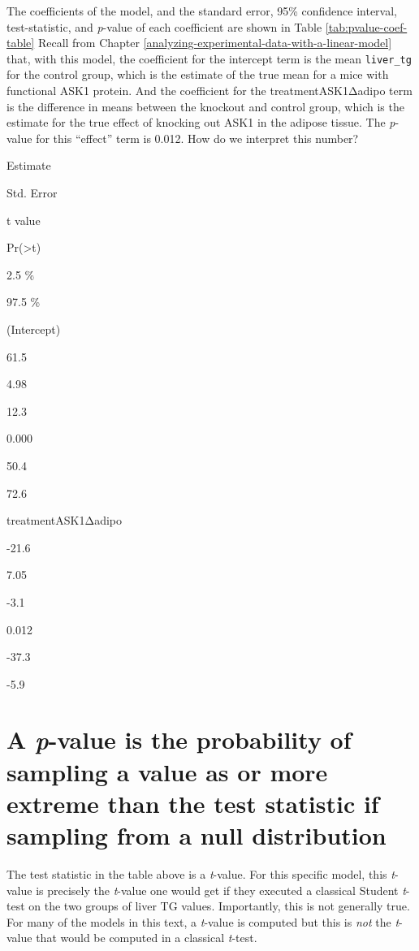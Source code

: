 \documentclass[]{book}
\begin{document}
The coefficients of the model, and the standard error, 95\% confidence interval, test-statistic, and \emph{p}-value of each coefficient are shown in Table \ref{tab:pvalue-coef-table} Recall from Chapter \ref{analyzing-experimental-data-with-a-linear-model} that, with this model, the coefficient for the intercept term is the mean \texttt{liver\_tg} for the control group, which is the estimate of the true mean for a mice with functional ASK1 protein. And the coefficient for the treatmentASK1Δadipo term is the difference in means between the knockout and control group, which is the estimate for the true effect of knocking out ASK1 in the adipose tissue. The \emph{p}-value for this ``effect'' term is 0.012. How do we interpret this number?

Estimate

Std. Error

t value

Pr(\textgreater\textbar t\textbar)

2.5 \%

97.5 \%

(Intercept)

61.5

4.98

12.3

0.000

50.4

72.6

treatmentASK1Δadipo

-21.6

7.05

-3.1

0.012

-37.3

-5.9

\hypertarget{a-p-value-is-the-probability-of-sampling-a-value-as-or-more-extreme-than-the-test-statistic-if-sampling-from-a-null-distribution}{%
\section{\texorpdfstring{A \emph{p}-value is the probability of sampling a value as or more extreme than the test statistic if sampling from a null distribution}{A p-value is the probability of sampling a value as or more extreme than the test statistic if sampling from a null distribution}}\label{a-p-value-is-the-probability-of-sampling-a-value-as-or-more-extreme-than-the-test-statistic-if-sampling-from-a-null-distribution}}

The test statistic in the table above is a \emph{t}-value. For this specific model, this \emph{t}-value is precisely the \emph{t}-value one would get if they executed a classical Student \emph{t}-test on the two groups of liver TG values. Importantly, this is not generally true. For many of the models in this text, a \emph{t}-value is computed but this is \emph{not} the \emph{t}-value that would be computed in a classical \emph{t}-test.
\end{document}

